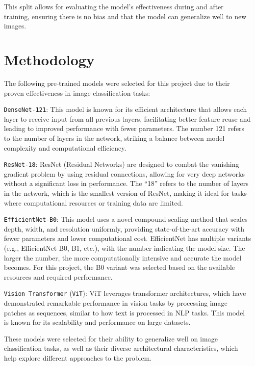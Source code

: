 \documentclass[12pt]{article}
\begin{document}
This split allows for evaluating the model's effectiveness during and
after training, ensuring there is no bias and that the model can
generalize well to new images.

    \section{Methodology}\label{methodology}

    The following pre-trained models were selected for this project due to
their proven effectiveness in image classification tasks:

\texttt{DenseNet-121}: This model is known for its efficient
architecture that allows each layer to receive input from all previous
layers, facilitating better feature reuse and leading to improved
performance with fewer parameters. The number 121 refers to the number
of layers in the network, striking a balance between model complexity
and computational efficiency.

\texttt{ResNet-18}: ResNet (Residual Networks) are designed to combat
the vanishing gradient problem by using residual connections, allowing
for very deep networks without a significant loss in performance. The
``18'' refers to the number of layers in the network, which is the
smallest version of ResNet, making it ideal for tasks where
computational resources or training data are limited.

\texttt{EfficientNet-B0}: This model uses a novel compound scaling
method that scales depth, width, and resolution uniformly, providing
state-of-the-art accuracy with fewer parameters and lower computational
cost. EfficientNet has multiple variants (e.g., EfficientNet-B0, B1,
etc.), with the number indicating the model size. The larger the number,
the more computationally intensive and accurate the model becomes. For
this project, the B0 variant was selected based on the available
resources and required performance.

\texttt{Vision\ Transformer} (\texttt{ViT}): ViT leverages transformer
architectures, which have demonstrated remarkable performance in vision
tasks by processing image patches as sequences, similar to how text is
processed in NLP tasks. This model is known for its scalability and
performance on large datasets.

These models were selected for their ability to generalize well on image
classification tasks, as well as their diverse architectural
characteristics, which help explore different approaches to the problem.
\end{document}
